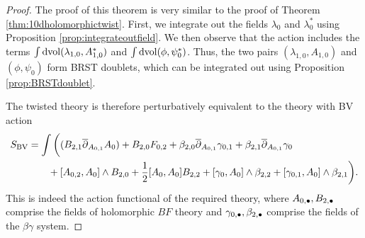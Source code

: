 \documentclass[10pt, oneside]{article}
\begin{document}
\begin{proof}
The proof of this theorem is very similar to the proof of Theorem \ref{thm:10dholomorphictwist}.  
First, we integrate out the fields $\lambda_0$ and $\lambda_0^*$ using Proposition \ref{prop:integrateoutfield}.  
We then observe that the action includes the terms $\int \operatorname{dvol}  (\lambda_{1,0} , A_{1,0}^*)$ and  $\int \operatorname{dvol} (\phi, \psi_0^*)$.  
Thus, the two pairs $(\lambda_{1,0}, A_{1,0})$ and $(\phi, \psi_0)$ form BRST doublets, 
which can be integrated out using Proposition \ref{prop:BRSTdoublet}.  

The twisted theory is therefore perturbatively equivalent to the theory with BV action 
\begin{align*}
 S_{\mathrm{BV}} &= \int \bigg( (B_{2,1} \overline{\partial}_{A_{0,1}} A_{0})  + B_{2,0} F_{0,2} + \beta_{2,0} \overline{\partial}_{A_{0,1}} \gamma_{0,1} + \beta_{2,1} \overline{\partial}_{A_{0,1}} \gamma_0 \\ 
  &\qquad  + [A_{0,2}, A_0]\wedge B_{2,0} + \frac{1}{2}[A_0, A_0]B_{2,2} +  [\gamma_0, A_0]\wedge \beta_{2,2} + [\gamma_{0,1}, A_0]\wedge \beta_{2,1}  \bigg).
\end{align*}
This is indeed the action functional of the required theory, where $A_{0,\bullet}, B_{2,\bullet}$ comprise the fields of holomorphic $BF$ theory and $\gamma_{0,\bullet}, \beta_{2,\bullet}$ comprise the fields of the $\beta\gamma$ system.
\end{proof}
\end{document}
